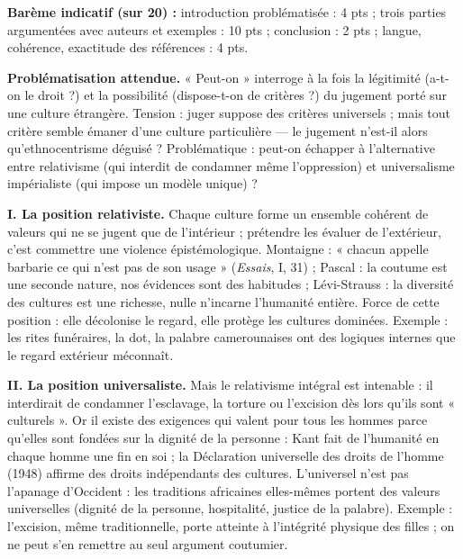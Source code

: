 \documentclass[11pt]{article}
\begin{document}
\begin{corrige}
\textbf{Barème indicatif (sur 20) :} introduction problématisée : 4 pts ; trois parties argumentées avec auteurs et exemples : 10 pts ; conclusion : 2 pts ; langue, cohérence, exactitude des références : 4 pts.

\textbf{Problématisation attendue.} « Peut-on » interroge à la fois la légitimité (a-t-on le droit ?) et la possibilité (dispose-t-on de critères ?) du jugement porté sur une culture étrangère. Tension : juger suppose des critères universels ; mais tout critère semble émaner d'une culture particulière — le jugement n'est-il alors qu'ethnocentrisme déguisé ? Problématique : peut-on échapper à l'alternative entre relativisme (qui interdit de condamner même l'oppression) et universalisme impérialiste (qui impose un modèle unique) ?

\textbf{I. La position relativiste.} Chaque culture forme un ensemble cohérent de valeurs qui ne se jugent que de l'intérieur ; prétendre les évaluer de l'extérieur, c'est commettre une violence épistémologique. Montaigne : « chacun appelle barbarie ce qui n'est pas de son usage » (\emph{Essais}, I, 31) ; Pascal : la coutume est une seconde nature, nos évidences sont des habitudes ; Lévi-Strauss : la diversité des cultures est une richesse, nulle n'incarne l'humanité entière. Force de cette position : elle décolonise le regard, elle protège les cultures dominées. Exemple : les rites funéraires, la dot, la palabre camerounaises ont des logiques internes que le regard extérieur méconnaît.

\textbf{II. La position universaliste.} Mais le relativisme intégral est intenable : il interdirait de condamner l'esclavage, la torture ou l'excision dès lors qu'ils sont « culturels ». Or il existe des exigences qui valent pour tous les hommes parce qu'elles sont fondées sur la dignité de la personne : Kant fait de l'humanité en chaque homme une fin en soi ; la Déclaration universelle des droits de l'homme (1948) affirme des droits indépendants des cultures. L'universel n'est pas l'apanage d'Occident : les traditions africaines elles-mêmes portent des valeurs universelles (dignité de la personne, hospitalité, justice de la palabre). Exemple : l'excision, même traditionnelle, porte atteinte à l'intégrité physique des filles ; on ne peut s'en remettre au seul argument coutumier.


\end{corrige}
\end{document}
